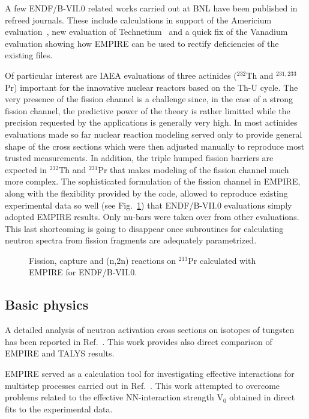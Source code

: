 \documentclass[twocolumn,amsmath,amssymb,10pt,groupedaddress,a4paper]{revtex4}
\begin{document}
A few ENDF/B-VII.0 related works carried out at BNL have been published in refreed journals. These include calculations in support of the  Americium evaluation~\cite{Rochman:06a}, new evaluation of Technetium~\cite{Rochman:07c} and a quick fix of the Vanadium~\cite{Rochman:06b} evaluation showing how EMPIRE can be used to rectify deficiencies of the existing files.

Of particular interest are IAEA evaluations of three actinides ($^{232}$Th and $^{231,233}$Pr) important for the innovative nuclear reactors based on the Th-U cycle. The very presence of the fission channel is a challenge since, in the case of a strong fission channel, the predictive power of the theory  is rather limitted while the precision requested by the applications is generally very high. In most actinides evaluations made so far nuclear reaction modeling served only to provide general shape of the cross sections which were then adjusted manually to reproduce most trusted measurements. In addition, the triple humped fission barriers are expected in $^{232}$Th and $^{231}$Pr that makes modeling of the fission channel much more complex. The sophisticated formulation of the fission channel in EMPIRE, along with the flexibility provided by the code, allowed to reproduce existing experimental data so well (see Fig.~\ref{231Pr}) that ENDF/B-VII.0 evaluations simply adopted EMPIRE results. Only nu-bars were taken over from other evaluations. This last shortcoming is going to disappear once subroutines for calculating neutron spectra from fission fragments are adequately parametrized.

\begin{figure}[htbp]
\caption{\label{231Pr} Fission, capture and (n,2n) reactions on $^{213}$Pr calculated with EMPIRE for ENDF/B-VII.0.}
\end{figure}


\subsection{Basic physics}
A detailed analysis of neutron activation cross sections on isotopes of tungsten has been reported in Ref.~\cite{Avrigeanu:06}. This work provides also direct comparison of EMPIRE and TALYS results.

EMPIRE served as a calculation tool for investigating effective interactions for multistep processes carried out in Ref.~\cite{avrigeanu2001eim}. This work attempted to overcome problems related to the effective NN-interaction strength V$_0$ obtained in direct fits to the experimental data.
\end{document}
